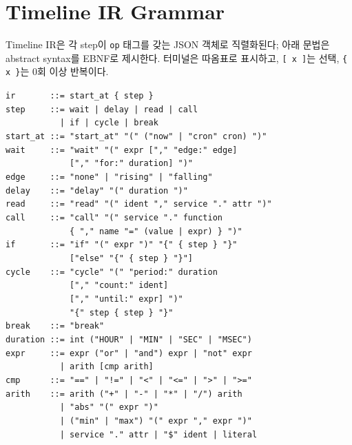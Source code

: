 \documentclass[sigconf,nonacm,anonymous,review]{acmart}
\begin{document}
\appendix

\section{Timeline IR Grammar}
\label{app:grammar}

Timeline IR은 각 step이 \texttt{op} 태그를 갖는 JSON 객체로 직렬화된다; 아래 문법은 abstract syntax를 EBNF로 제시한다. 터미널은 따옴표로 표시하고, \texttt{[\,x\,]}는 선택, \texttt{\{\,x\,\}}는 0회 이상 반복이다.

{\small
\begin{flushleft}
\texttt{ir \ \ \ \ \ \ ::= start\_at \{ step \}}\\
\texttt{step \ \ \ \ ::= wait | delay | read | call}\\
\texttt{\ \ \ \ \ \ \ \ \ \ \ | if | cycle | break}\\[3pt]
\texttt{start\_at ::= "start\_at" "(" ("now" | "cron" cron) ")"}\\
\texttt{wait \ \ \ \ ::= "wait" "(" expr ["," "edge:" edge]}\\
\texttt{\ \ \ \ \ \ \ \ \ \ \ \ \ ["," "for:" duration] ")"}\\
\texttt{edge \ \ \ \ ::= "none" | "rising" | "falling"}\\
\texttt{delay \ \ \ ::= "delay" "(" duration ")"}\\
\texttt{read \ \ \ \ ::= "read" "(" ident "," service "." attr ")"}\\
\texttt{call \ \ \ \ ::= "call" "(" service "." function}\\
\texttt{\ \ \ \ \ \ \ \ \ \ \ \ \ \{ "," name "=" (value | expr) \} ")"}\\
\texttt{if \ \ \ \ \ \ ::= "if" "(" expr ")" "\{" \{ step \} "\}"}\\
\texttt{\ \ \ \ \ \ \ \ \ \ \ \ \ ["else" "\{" \{ step \} "\}"]}\\
\texttt{cycle \ \ \ ::= "cycle" "(" "period:" duration}\\
\texttt{\ \ \ \ \ \ \ \ \ \ \ \ \ ["," "count:" ident]}\\
\texttt{\ \ \ \ \ \ \ \ \ \ \ \ \ ["," "until:" expr] ")"}\\
\texttt{\ \ \ \ \ \ \ \ \ \ \ \ \ "\{" step \{ step \} "\}"}\\
\texttt{break \ \ \ ::= "break"}\\[3pt]
\texttt{duration ::= int ("HOUR" | "MIN" | "SEC" | "MSEC")}\\[3pt]
\texttt{expr \ \ \ \ ::= expr ("or" | "and") expr | "not" expr}\\
\texttt{\ \ \ \ \ \ \ \ \ \ \ | arith [cmp arith]}\\
\texttt{cmp \ \ \ \ \ ::= "==" | "!=" | "<" | "<=" | ">" | ">="}\\
\texttt{arith \ \ \ ::= arith ("+" | "-" | "*" | "/") arith}\\
\texttt{\ \ \ \ \ \ \ \ \ \ \ | "abs" "(" expr ")"}\\
\texttt{\ \ \ \ \ \ \ \ \ \ \ | ("min" | "max") "(" expr "," expr ")"}\\
\texttt{\ \ \ \ \ \ \ \ \ \ \ | service "." attr | "\$" ident | literal}
\end{flushleft}
}
\end{document}
